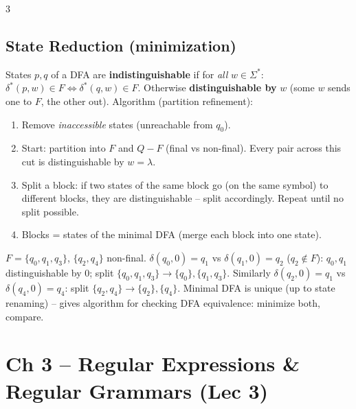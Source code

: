 \documentclass[9pt,a4paper,landscape]{extarticle}
\newcommand{\ex}[1]{\frm[FireBrick]{\textbf{Ex.\ #1}}}
\newcommand{\df}[1]{\frm[DodgerBlue]{\textbf{Def.\ #1}}}
\begin{document}
\begin{multicols*}{3}
\subsection{State Reduction (minimization)}
\df{2.8} States $p,q$ of a DFA are \textbf{indistinguishable} if for \emph{all} $w\in\Sigma^*$: $\delta^*(p,w)\in F\iff\delta^*(q,w)\in F$. Otherwise \textbf{distinguishable by} $w$ (some $w$ sends one to $F$, the other out).
Algorithm (partition refinement):
\begin{enumerate}
\item Remove \emph{inaccessible} states (unreachable from $q_0$).
\item Start: partition into $F$ and $Q-F$ (final vs non-final). Every pair across this cut is distinguishable by $w=\lambda$.
\item Split a block: if two states of the same block go (on the same symbol) to different blocks, they are distinguishable -- split accordingly. Repeat until no split possible.
\item Blocks = states of the minimal DFA (merge each block into one state).
\end{enumerate}
\ex{2.15} $F=\{q_0,q_1,q_3\}$, $\{q_2,q_4\}$ non-final. $\delta(q_0,0)=q_1$ vs $\delta(q_1,0)=q_2$ ($q_2\notin F$): $q_0,q_1$ distinguishable by 0; split $\{q_0,q_1,q_3\}\to\{q_0\},\{q_1,q_3\}$. Similarly $\delta(q_2,0)=q_1$ vs $\delta(q_4,0)=q_4$: split $\{q_2,q_4\}\to\{q_2\},\{q_4\}$.
Minimal DFA is unique (up to state renaming) -- gives algorithm for checking DFA equivalence: minimize both, compare.

\section{Ch 3 -- Regular Expressions \& Regular Grammars (Lec 3)}

\end{multicols*}
\end{document}
